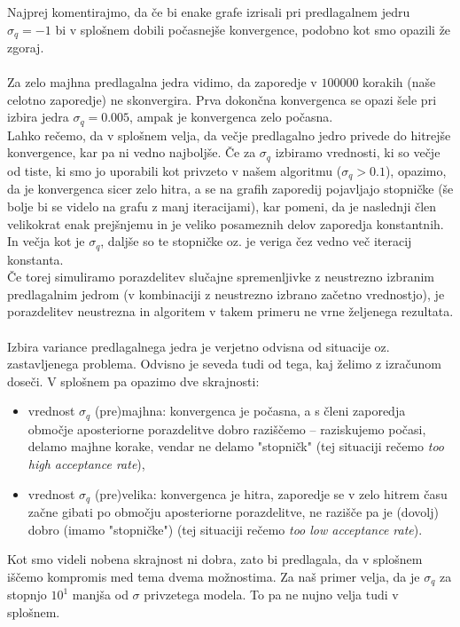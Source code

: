 \documentclass[a4paper,11pt]{article}
\begin{document}
\noindent
Najprej komentirajmo, da če bi enake grafe izrisali pri predlagalnem jedru $\sigma_q = -1$ bi v splošnem dobili počasnejše konvergence, podobno kot smo opazili že zgoraj.
\\
\\
Za zelo majhna predlagalna jedra vidimo, da zaporedje v $100000$ korakih (naše celotno zaporedje) ne skonvergira. Prva dokončna konvergenca se opazi šele pri izbira jedra $\sigma_q = 0.005$, ampak je konvergenca zelo počasna.
\\
Lahko rečemo, da v splošnem velja, da večje predlagalno jedro privede do hitrejše konvergence, kar pa ni vedno najboljše. 
Če za $\sigma_q$ izbiramo vrednosti, ki so večje od tiste, ki smo jo uporabili kot privzeto v našem algoritmu ($\sigma_q > 0.1$), opazimo, da je konvergenca sicer zelo hitra, a se na grafih zaporedij pojavljajo stopničke (še bolje bi se videlo na grafu z manj iteracijami), kar pomeni, da je naslednji člen velikokrat enak prejšnjemu in je veliko posameznih delov zaporedja konstantnih.
In večja kot je $\sigma_q$, daljše so te stopničke oz. je veriga čez vedno več iteracij konstanta.
\\
Če torej simuliramo porazdelitev slučajne spremenljivke z neustrezno izbranim predlagalnim jedrom (v kombinaciji z neustrezno izbrano začetno vrednostjo), je porazdelitev neustrezna in algoritem v takem primeru ne vrne željenega rezultata.
\\
\\
Izbira variance predlagalnega jedra je verjetno odvisna od situacije oz. zastavljenega problema. Odvisno je seveda tudi od tega, kaj želimo z izračunom doseči.
V splošnem pa opazimo dve skrajnosti: 
\begin{itemize}
    \item vrednost $\sigma_q$ (pre)majhna: konvergenca je počasna, a s členi zaporedja območje aposteriorne porazdelitve dobro raziščemo -- raziskujemo počasi, delamo majhne korake, vendar ne delamo "stopničk" (tej situaciji rečemo \textit{too high acceptance rate}),
    \item vrednost $\sigma_q$ (pre)velika: konvergenca je hitra, zaporedje se v zelo hitrem času začne gibati po območju aposteriorne porazdelitve, ne razišče pa je (dovolj) dobro (imamo "stopničke") (tej situaciji rečemo \textit{too low acceptance rate}).
\end{itemize}
Kot smo videli nobena skrajnost ni dobra, zato bi predlagala, da v splošnem iščemo kompromis med tema dvema možnostima.
Za naš primer velja, da je $\sigma_q$ za stopnjo $10^1$ manjša od $\sigma$ privzetega modela. To pa ne nujno velja tudi v splošnem.
\end{document}
